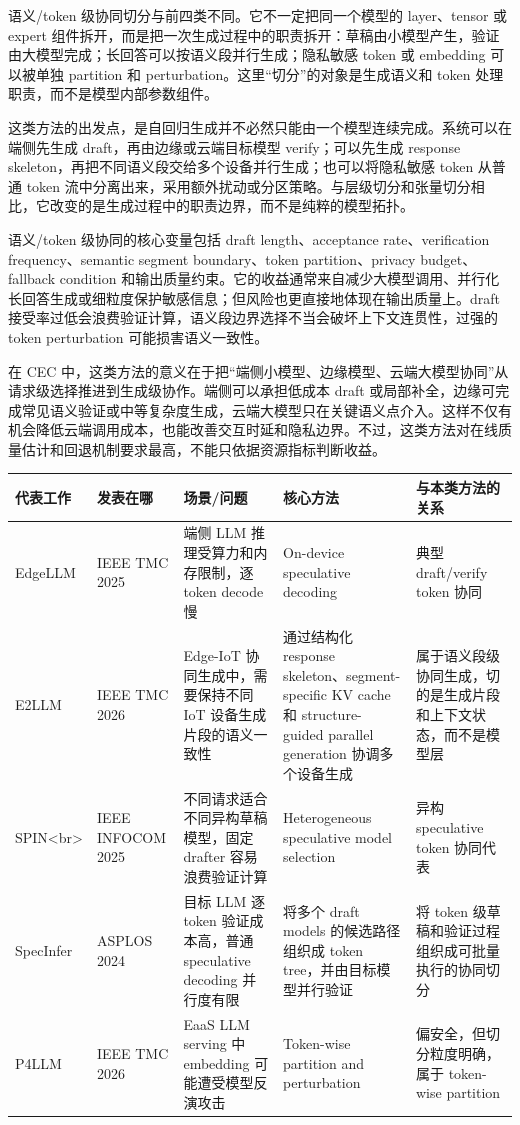 \documentclass[a4paper,10pt]{ctexart}
\begin{document}
语义/token 级协同切分与前四类不同。它不一定把同一个模型的 layer、tensor 或 expert 组件拆开，而是把一次生成过程中的职责拆开：草稿由小模型产生，验证由大模型完成；长回答可以按语义段并行生成；隐私敏感 token 或 embedding 可以被单独 partition 和 perturbation。这里“切分”的对象是生成语义和 token 处理职责，而不是模型内部参数组件。


这类方法的出发点，是自回归生成并不必然只能由一个模型连续完成。系统可以在端侧先生成 draft，再由边缘或云端目标模型 verify；可以先生成 response skeleton，再把不同语义段交给多个设备并行生成；也可以将隐私敏感 token 从普通 token 流中分离出来，采用额外扰动或分区策略。与层级切分和张量切分相比，它改变的是生成过程中的职责边界，而不是纯粹的模型拓扑。


语义/token 级协同的核心变量包括 draft length、acceptance rate、verification frequency、semantic segment boundary、token partition、privacy budget、fallback condition 和输出质量约束。它的收益通常来自减少大模型调用、并行化长回答生成或细粒度保护敏感信息；但风险也更直接地体现在输出质量上。draft 接受率过低会浪费验证计算，语义段边界选择不当会破坏上下文连贯性，过强的 token perturbation 可能损害语义一致性。


在 CEC 中，这类方法的意义在于把“端侧小模型、边缘模型、云端大模型协同”从请求级选择推进到生成级协作。端侧可以承担低成本 draft 或局部补全，边缘可完成常见语义验证或中等复杂度生成，云端大模型只在关键语义点介入。这样不仅有机会降低云端调用成本，也能改善交互时延和隐私边界。不过，这类方法对在线质量估计和回退机制要求最高，不能只依据资源指标判断收益。


\begin{table}[H]
\centering
\scriptsize
\setlength{\tabcolsep}{3pt}
\renewcommand{\arraystretch}{1.15}
\begin{tabularx}{\textwidth}{|X|X|X|X|X|}
\hline
\textbf{代表工作} & \textbf{发表在哪} & \textbf{场景/问题} & \textbf{核心方法} & \textbf{与本类方法的关系} \\ \hline
EdgeLLM & IEEE TMC 2025 & 端侧 LLM 推理受算力和内存限制，逐 token decode 慢 & On-device speculative decoding & 典型 draft/verify token 协同 \\ \hline
E2LLM & IEEE TMC 2026 & Edge-IoT 协同生成中，需要保持不同 IoT 设备生成片段的语义一致性 & 通过结构化 response skeleton、segment-specific KV cache 和 structure-guided parallel generation 协调多个设备生成 & 属于语义段级协同生成，切的是生成片段和上下文状态，而不是模型层 \\ \hline
SPIN<br> & IEEE INFOCOM 2025 & 不同请求适合不同异构草稿模型，固定 drafter 容易浪费验证计算 & Heterogeneous speculative model selection & 异构 speculative token 协同代表 \\ \hline
SpecInfer & ASPLOS 2024 & 目标 LLM 逐 token 验证成本高，普通 speculative decoding 并行度有限 & 将多个 draft models 的候选路径组织成 token tree，并由目标模型并行验证 & 将 token 级草稿和验证过程组织成可批量执行的协同切分 \\ \hline
P4LLM & IEEE TMC 2026 & EaaS LLM serving 中 embedding 可能遭受模型反演攻击 & Token-wise partition and perturbation & 偏安全，但切分粒度明确，属于 token-wise partition \\ \hline
\end{tabularx}
\end{table}
\end{document}
